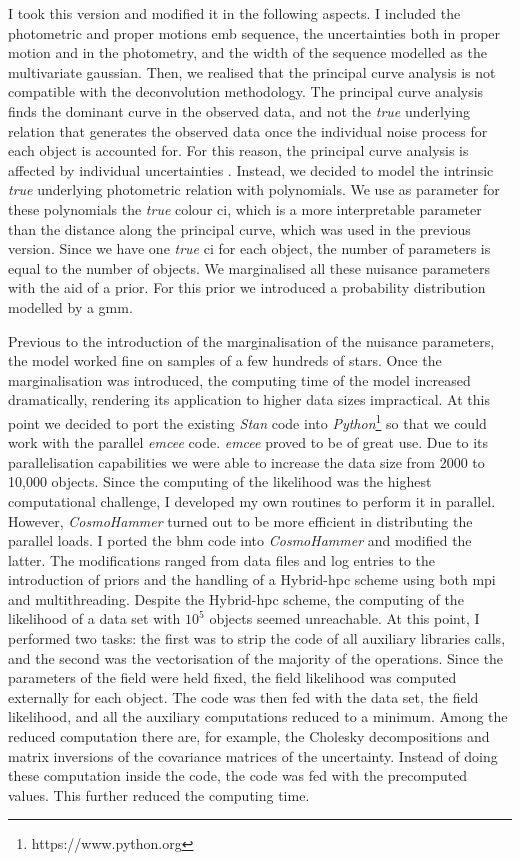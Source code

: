 I took this version and modified it in the following aspects. I included the photometric and proper motions \gls{emb} sequence, the uncertainties both in proper motion and in the photometry, and the width of the sequence modelled as the multivariate gaussian. Then, we realised that the principal curve analysis is not compatible with the deconvolution methodology. {The principal curve analysis finds the dominant curve in the observed data, and not the \emph{true} underlying relation that generates the observed data once the individual noise process for each object is accounted for. For this reason, the principal curve analysis is affected by individual uncertainties \cite[see][for the negative impact of heteroscedastic data on the related principal component analysis]{Hong2016}. Instead, we decided to model the intrinsic \emph{true} underlying photometric relation with polynomials. We use as parameter for these polynomials the \emph{true} colour \gls{ci}, which is a more interpretable parameter than the distance along the principal curve, which was used in the previous version. Since we have one \emph{true} \gls{ci} for each object, the number of parameters is equal to the number of objects. We marginalised all these nuisance parameters with the aid of a prior. For this prior we introduced a probability distribution modelled by a \gls{gmm}.}

Previous to the introduction of the marginalisation of the nuisance parameters, the model worked fine on samples of a few hundreds of stars. Once the marginalisation was introduced, the computing time of the model increased dramatically, rendering its application to higher data sizes impractical. At this point we decided to port the existing \emph{Stan} code into \emph
{Python}\footnote{https://www.python.org} so that we could work with the parallel \emph{emcee} code. \emph{emcee} proved to be of great use. Due to its parallelisation capabilities we were able to increase the data size from 2000 to 10,000 objects. Since the computing of the likelihood was the highest computational challenge, I developed my own routines to perform it in parallel. However, \emph{CosmoHammer} \citep{Akeret2013} turned out to be more efficient in distributing the parallel loads. I ported the \gls{bhm} code into \emph{CosmoHammer} and modified the latter. The modifications ranged from data files and log entries to the introduction of priors and the handling of a Hybrid-\gls{hpc} scheme using both \gls{mpi} and multithreading. Despite the Hybrid-\gls{hpc} scheme, the computing of the likelihood of a data set with $10^5$ objects seemed unreachable. At this point, I performed two tasks: the first was to strip the code of all auxiliary libraries calls, and the second was the vectorisation of the majority of the operations. Since the parameters of the field were held fixed, the field likelihood was computed externally for each object. The code was then fed with the data set, the field likelihood, and all the auxiliary computations reduced to a minimum. Among the reduced computation there are, for example, the Cholesky decompositions and matrix inversions of the covariance matrices of the uncertainty. Instead of doing these computation inside the code, the code was fed with the precomputed values. This further reduced the computing time.

